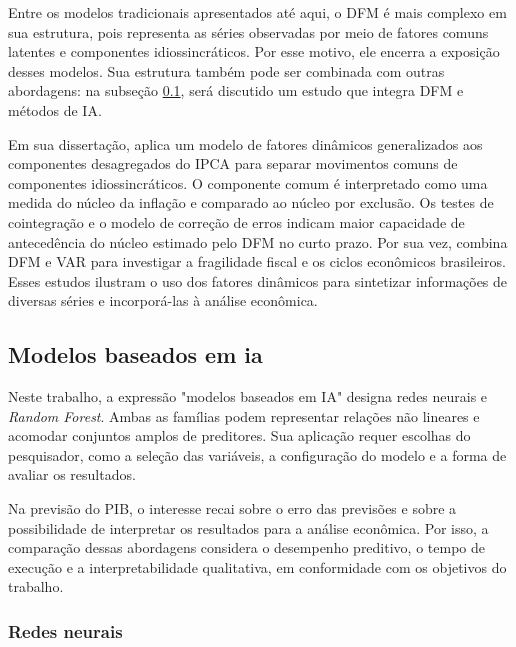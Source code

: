 Entre os modelos tradicionais apresentados até aqui, o DFM é mais complexo em sua estrutura, pois representa as séries observadas por meio de fatores comuns latentes e componentes idiossincráticos. Por esse motivo, ele encerra a exposição desses modelos. Sua estrutura também pode ser combinada com outras abordagens: na subseção \ref{subs:AI_models}, será discutido um estudo que integra DFM e métodos de IA.


Em sua dissertação,  aplica um modelo de fatores dinâmicos generalizados aos componentes desagregados do IPCA para separar movimentos comuns de componentes idiossincráticos. O componente comum é interpretado como uma medida do núcleo da inflação e comparado ao núcleo por exclusão. Os testes de cointegração e o modelo de correção de erros indicam maior capacidade de antecedência do núcleo estimado pelo DFM no curto prazo. Por sua vez,  combina DFM e VAR para investigar a fragilidade fiscal e os ciclos econômicos brasileiros. Esses estudos ilustram o uso dos fatores dinâmicos para sintetizar informações de diversas séries e incorporá-las à análise econômica.

\subsection{Modelos baseados em \ac{ia}}
\label{subs:AI_models}

Neste trabalho, a expressão "modelos baseados em IA" designa redes neurais e \textit{Random Forest}. Ambas as famílias podem representar relações não lineares e acomodar conjuntos amplos de preditores. Sua aplicação requer escolhas do pesquisador, como a seleção das variáveis, a configuração do modelo e a forma de avaliar os resultados.

Na previsão do PIB, o interesse recai sobre o erro das previsões e sobre a possibilidade de interpretar os resultados para a análise econômica. Por isso, a comparação dessas abordagens considera o desempenho preditivo, o tempo de execução e a interpretabilidade qualitativa, em conformidade com os objetivos do trabalho.

\subsubsection{Redes neurais}


